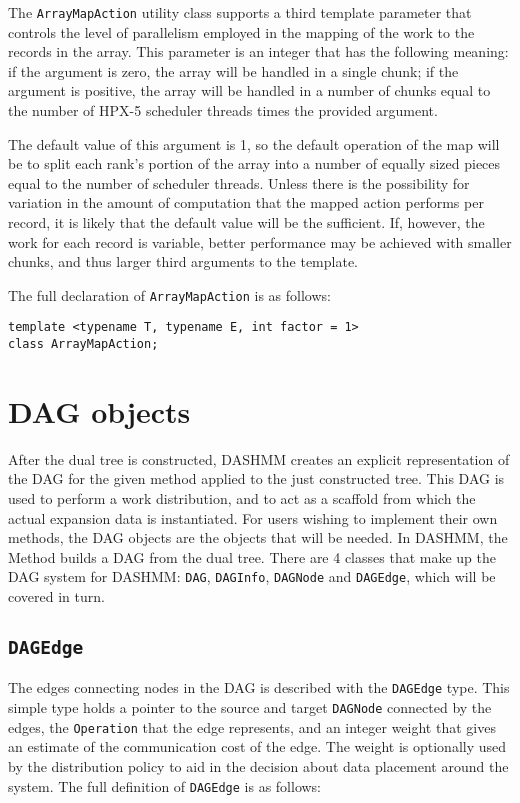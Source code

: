 The \texttt{ArrayMapAction} utility class supports a third template parameter
that controls the level of parallelism employed in the mapping of the work
to the records in the array. This parameter is an integer that has the
following meaning: if the argument is zero, the array will be handled in a
single chunk; if the argument is positive, the array will be handled in a number
of chunks equal to the number of HPX-5 scheduler threads times the provided
argument.

The default value of this argument is 1, so the default operation of
the map will be to split each rank's portion of the array into a number of
equally sized pieces equal to the number of scheduler threads. Unless there is
the possibility for variation in the amount of computation that the mapped
action performs per record, it is likely that the default value will be
the sufficient. If, however, the work for each record is variable, better
performance may be achieved with smaller chunks, and thus larger third arguments
to the template.

The full declaration of \texttt{ArrayMapAction} is as follows:

\begin{verbatim}
template <typename T, typename E, int factor = 1>
class ArrayMapAction;
\end{verbatim}



\section{DAG objects}

After the dual tree is constructed, DASHMM creates an explicit representation
of the DAG for the given method applied to the just constructed tree. This DAG
is used to perform a work distribution, and to act as a scaffold from which
the actual expansion data is instantiated. For users wishing to implement
their own methods, the DAG objects are the objects that will be needed. In
DASHMM, the Method builds a DAG from the dual tree. There are 4 classes that
make up the DAG system for DASHMM: \texttt{DAG}, \texttt{DAGInfo},
\texttt{DAGNode} and \texttt{DAGEdge}, which will be covered in turn.

\subsection{\texttt{DAGEdge}}

The edges connecting nodes in the DAG is described with the \texttt{DAGEdge}
type. This simple type holds a pointer to the source and target
\texttt{DAGNode} connected by the edges, the \texttt{Operation} that the edge
represents, and an integer weight that gives an estimate of the communication
cost of the edge. The weight is optionally used by the distribution policy to
aid in the decision about data placement around the system. The full definition
of \texttt{DAGEdge} is as follows:

